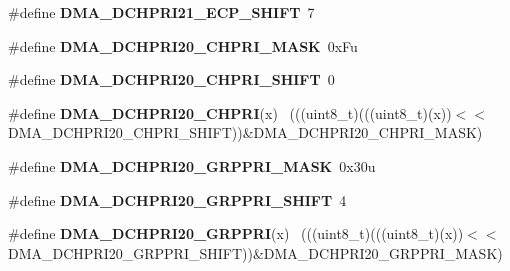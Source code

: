 \begin{DoxyCompactItemize}
\item 
\hypertarget{group___d_m_a___register___masks_ga741e7971e27f1be4aeb5d4d0b94de299}{}\#define {\bfseries D\+M\+A\+\_\+\+D\+C\+H\+P\+R\+I21\+\_\+\+E\+C\+P\+\_\+\+S\+H\+I\+F\+T}~7\label{group___d_m_a___register___masks_ga741e7971e27f1be4aeb5d4d0b94de299}

\item 
\hypertarget{group___d_m_a___register___masks_gadcb0d5592cbd7c2e606fadb869b5904c}{}\#define {\bfseries D\+M\+A\+\_\+\+D\+C\+H\+P\+R\+I20\+\_\+\+C\+H\+P\+R\+I\+\_\+\+M\+A\+S\+K}~0x\+Fu\label{group___d_m_a___register___masks_gadcb0d5592cbd7c2e606fadb869b5904c}

\item 
\hypertarget{group___d_m_a___register___masks_ga79bcea20a5498ab941b746392d3baf9a}{}\#define {\bfseries D\+M\+A\+\_\+\+D\+C\+H\+P\+R\+I20\+\_\+\+C\+H\+P\+R\+I\+\_\+\+S\+H\+I\+F\+T}~0\label{group___d_m_a___register___masks_ga79bcea20a5498ab941b746392d3baf9a}

\item 
\hypertarget{group___d_m_a___register___masks_ga75bec2e7135f132e353103e20f7872d9}{}\#define {\bfseries D\+M\+A\+\_\+\+D\+C\+H\+P\+R\+I20\+\_\+\+C\+H\+P\+R\+I}(x)                                    ~(((uint8\+\_\+t)(((uint8\+\_\+t)(x))$<$$<$D\+M\+A\+\_\+\+D\+C\+H\+P\+R\+I20\+\_\+\+C\+H\+P\+R\+I\+\_\+\+S\+H\+I\+F\+T))\&D\+M\+A\+\_\+\+D\+C\+H\+P\+R\+I20\+\_\+\+C\+H\+P\+R\+I\+\_\+\+M\+A\+S\+K)\label{group___d_m_a___register___masks_ga75bec2e7135f132e353103e20f7872d9}

\item 
\hypertarget{group___d_m_a___register___masks_ga857d4d291ad3f4bd8dbe977927f8f0f5}{}\#define {\bfseries D\+M\+A\+\_\+\+D\+C\+H\+P\+R\+I20\+\_\+\+G\+R\+P\+P\+R\+I\+\_\+\+M\+A\+S\+K}~0x30u\label{group___d_m_a___register___masks_ga857d4d291ad3f4bd8dbe977927f8f0f5}

\item 
\hypertarget{group___d_m_a___register___masks_ga8a5d910068ef7e4d1545459f8d3d8a16}{}\#define {\bfseries D\+M\+A\+\_\+\+D\+C\+H\+P\+R\+I20\+\_\+\+G\+R\+P\+P\+R\+I\+\_\+\+S\+H\+I\+F\+T}~4\label{group___d_m_a___register___masks_ga8a5d910068ef7e4d1545459f8d3d8a16}

\item 
\hypertarget{group___d_m_a___register___masks_gaa27605f76400abbd5240b324d87a4747}{}\#define {\bfseries D\+M\+A\+\_\+\+D\+C\+H\+P\+R\+I20\+\_\+\+G\+R\+P\+P\+R\+I}(x)                                  ~(((uint8\+\_\+t)(((uint8\+\_\+t)(x))$<$$<$D\+M\+A\+\_\+\+D\+C\+H\+P\+R\+I20\+\_\+\+G\+R\+P\+P\+R\+I\+\_\+\+S\+H\+I\+F\+T))\&D\+M\+A\+\_\+\+D\+C\+H\+P\+R\+I20\+\_\+\+G\+R\+P\+P\+R\+I\+\_\+\+M\+A\+S\+K)\label{group___d_m_a___register___masks_gaa27605f76400abbd5240b324d87a4747}


\end{DoxyCompactItemize}
